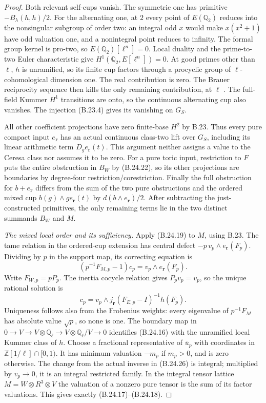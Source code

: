 \begin{proof}
Both relevant self-cups vanish. The symmetric one
has primitive $-B_\lambda(h,h)/2$.
For the alternating one, at $2$ every point of
$E(\mathbb Q_2)$ reduces into the nonsingular
subgroup of order two: an integral odd $x$ would make
$x(x^2+1)$ have odd valuation one, and a nonintegral
point reduces to infinity. The formal group kernel
is pro-two, so $E(\mathbb Q_2)[\ell^n]=0$.
Local duality and the prime-to-two Euler characteristic
\citep[I, Theorem 2.1 and Lemma 2.9]{BMilne2006}
give $H^1(\mathbb Q_2,E[\ell^n])=0$.
At good primes other than $\ell$, $h$ is unramified,
so its finite cup factors through a procyclic group
of $\ell$-cohomological dimension one. The real
contribution is zero. The Brauer reciprocity sequence
then kills the only remaining contribution, at $\ell$
\citep[VIII, Theorem 4.2]{BMilneCFT2020}.
The full-field Kummer $H^1$ transitions are onto,
so the continuous alternating cup also vanishes.
The injection (B.23.4) gives its vanishing on $G_S$.

All other coefficient projections have zero finite-base
$H^2$ by B.23. Thus every pure compact input
$e_{\mathbf r}$ has an actual continuous class-two
lift over $G_S$, including its linear arithmetic
term $D_g e_{\mathbf r}(t)$.
This argument neither assigns a value to the Ceresa
class nor assumes it to be zero.
For a pure toric input, restriction to $F$ puts the
entire obstruction in $B_W$ by (B.24.22), so
its other projections are boundaries by degree-four
restriction/corestriction.
Finally the full obstruction for $b+e_{\mathbf r}$
differs from the sum of the two pure obstructions
and the ordered mixed cup
$b(g)\wedge g e_{\mathbf r}(t)$ by
$d(b\wedge e_{\mathbf r})/2$.
After subtracting the just-constructed primitives,
the only remaining terms lie in the two distinct
summands $B_W$ and $M$.

\emph{The mixed local order and its sufficiency.}
Apply (B.24.19) to $M$, using B.23.
The tame relation in the ordered-cup extension has
central defect
$-p\,v_p\wedge e_{\mathbf r}(F_p)$.
Dividing by $p$ in the support map, its correcting
equation is
\[
 (p^{-1}F_{M,p}-1)c_p
        =v_p\wedge e_{\mathbf r}(F_p).
                                                               \tag{B.24.25}
\]
Write $F_{W,p}=pP_p$. The inertia cocycle relation
gives $P_pv_p=v_p$, so the unique rational solution is
\[
 c_p=v_p\wedge
          j_{\mathbf r}(F_{E,p}-I)^{-1}h(F_p).
                                                               \tag{B.24.26}
\]
Uniqueness follows also from the Frobenius weights:
every eigenvalue of $p^{-1}F_M$ has absolute value
$\sqrt p$, so none is one.
The boundary map in
$0\to V\to V\otimes\mathbb Q_\ell
       \to V\otimes\mathbb Q_\ell/V\to0$
identifies (B.24.16) with the unramified local
Kummer class of $h$. Choose a fractional representative
of $\overline u_p$ with coordinates in
$\mathbb Z[1/\ell]\cap[0,1)$.
It has minimum valuation $-m_p$ if $m_p>0$,
and is zero otherwise. The change from the actual
inverse in (B.24.26) is integral; multiplied by
$v_p\to0$, it is an integral restricted family.
In the integral tensor lattice
$M=W\otimes R^3\otimes V$ the valuation of a nonzero
pure tensor is the sum of its factor valuations.
This gives exactly (B.24.17)--(B.24.18).


\end{proof}
